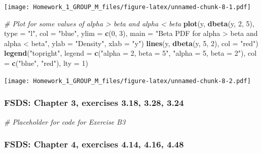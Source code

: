 \documentclass[
]{article}
\newenvironment{Shaded}{\begin{snugshade}}{\end{snugshade}}
\newcommand{\AttributeTok}[1]{\textcolor[rgb]{0.13,0.29,0.53}{#1}}
\newcommand{\CommentTok}[1]{\textcolor[rgb]{0.56,0.35,0.01}{\textit{#1}}}
\newcommand{\DecValTok}[1]{\textcolor[rgb]{0.00,0.00,0.81}{#1}}
\newcommand{\FunctionTok}[1]{\textcolor[rgb]{0.13,0.29,0.53}{\textbf{#1}}}
\newcommand{\NormalTok}[1]{#1}
\newcommand{\StringTok}[1]{\textcolor[rgb]{0.31,0.60,0.02}{#1}}
\begin{document}
\texttt{[image: Homework\_1\_GROUP\_M\_files/figure-latex/unnamed-chunk-8-1.pdf]}

\begin{Shaded}
\begin{Highlighting}[]
\CommentTok{\# Plot for some values of alpha \textgreater{} beta and alpha \textless{} beta}
\FunctionTok{plot}\NormalTok{(y, }\FunctionTok{dbeta}\NormalTok{(y, }\DecValTok{2}\NormalTok{, }\DecValTok{5}\NormalTok{), }\AttributeTok{type =} \StringTok{"l"}\NormalTok{, }\AttributeTok{col =} \StringTok{"blue"}\NormalTok{, }\AttributeTok{ylim =} \FunctionTok{c}\NormalTok{(}\DecValTok{0}\NormalTok{, }\DecValTok{3}\NormalTok{),}
     \AttributeTok{main =} \StringTok{"Beta PDF for alpha \textgreater{} beta and alpha \textless{} beta"}\NormalTok{,}
     \AttributeTok{ylab =} \StringTok{"Density"}\NormalTok{, }\AttributeTok{xlab =} \StringTok{"y"}\NormalTok{)}
\FunctionTok{lines}\NormalTok{(y, }\FunctionTok{dbeta}\NormalTok{(y, }\DecValTok{5}\NormalTok{, }\DecValTok{2}\NormalTok{), }\AttributeTok{col =} \StringTok{"red"}\NormalTok{)}
\FunctionTok{legend}\NormalTok{(}\StringTok{"topright"}\NormalTok{, }\AttributeTok{legend =} \FunctionTok{c}\NormalTok{(}\StringTok{"alpha = 2, beta = 5"}\NormalTok{, }\StringTok{"alpha = 5, beta = 2"}\NormalTok{),}
       \AttributeTok{col =} \FunctionTok{c}\NormalTok{(}\StringTok{"blue"}\NormalTok{, }\StringTok{"red"}\NormalTok{), }\AttributeTok{lty =} \DecValTok{1}\NormalTok{)}
\end{Highlighting}
\end{Shaded}

\texttt{[image: Homework\_1\_GROUP\_M\_files/figure-latex/unnamed-chunk-8-2.pdf]}

\hypertarget{fsds-chapter-3-exercises-3.18-3.28-3.24}{%
\subsubsection{FSDS: Chapter 3, exercises 3.18, 3.28,
3.24}\label{fsds-chapter-3-exercises-3.18-3.28-3.24}}

\begin{Shaded}
\begin{Highlighting}[]
\CommentTok{\# Placeholder for code for Exercise B3}
\end{Highlighting}
\end{Shaded}

\hypertarget{fsds-chapter-4-exercises-4.14-4.16-4.48}{%
\subsubsection{FSDS: Chapter 4, exercises 4.14, 4.16,
4.48}\label{fsds-chapter-4-exercises-4.14-4.16-4.48}}
\end{document}
